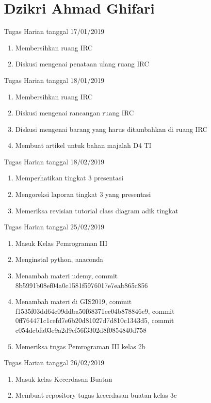 \chapter{Dzikri Ahmad Ghifari}

Tugas Harian tanggal 17/01/2019
\begin{enumerate}
\item Membersihkan ruang IRC
\item Diskusi mengenai penataan ulang ruang IRC
\end{enumerate}

Tugas Harian tanggal 18/01/2019
\begin{enumerate}
\item Membersihkan ruang IRC
\item Diskusi mengenai rancangan ruang IRC
\item Diskusi mengenai barang yang harus ditambahkan di ruang IRC
\item Membuat artikel untuk bahan majalah D4 TI
\end{enumerate}

Tugas Harian tanggal 18/02/2019
\begin{enumerate}
\item Memperhatikan tingkat 3 presentasi
\item Mengoreksi laporan tingkat 3 yang presentasi
\item Memeriksa revisian tutorial class diagram adik tingkat
\end{enumerate}

Tugas Harian tanggal 25/02/2019
\begin{enumerate}
\item Masuk Kelas Pemrograman III
\item Menginstal python, anaconda
\item Menambah materi udemy, commit 8b5991b08ef04a0c1581f5976017e7eab865c856
\item Menambah materi di GIS2019, commit f1535f03dd64c09ddba50f68371ec04b878846e9, commit 0ff764471c1cefd7e6b20d81027d7d810c1343d5, commit c054dcbfa03e9a2d9ef56f3302d8f0854840d758
\item Memeriksa tugas Pemrograman III kelas 2b 
\end{enumerate}

Tugas Harian tanggal 26/02/2019
\begin{enumerate}
\item Masuk kelas Kecerdasan Buatan
\item Membuat repository tugas kecerdasan buatan kelas 3c
\end{enumerate}



